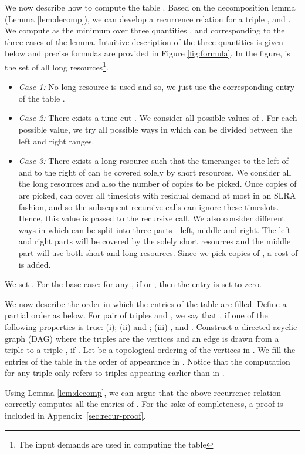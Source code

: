 \documentclass[11pt]{article}
\begin{document}
We now describe how to compute the table . 
Based on the decomposition lemma (Lemma \ref{lem:decomp}), we can develop a recurrence relation 
for a triple ,  and . 
We compute  as the minimum over three quantities ,  and  corresponding to the three cases
of the lemma. Intuitive description of the three quantities is given below and precise formulas are provided
in Figure \ref{fig:formula}. In the figure,  is the set of all long resources\footnote{The input demands
 are used in computing the table }.
\begin{itemize}
\item 
{\it Case 1: } 
No long resource is used and so, we just use the 
corresponding entry of the table . 
\item
{\it Case 2: } There exists a time-cut . We consider all possible values
of . For each possible value, we try all possible ways in which  can be divided between the left and right ranges.
\item
{\it Case 3: }
There exists a long resource  such that the timeranges to the left of and to the right of
 can be covered solely by short resources.
We consider all the long resources  and also the number of copies  to be picked.
Once  copies of  are picked,  can cover all timeslots with residual demand at most
 in an SLRA fashion, and so the subsequent recursive calls can ignore these timeslots.
Hence, this value is passed to the recursive call.
We also consider different ways in which  can be split into three parts - left, middle and right.
The left and right parts will be covered by the solely short resources and the middle part will use both 
short and long resources.
Since we pick  copies of , a cost of  is added.
\end{itemize}
We set . For the base case: for any , if  or ,
then the entry is set to zero.

We now describe the order in which the entries of the table are filled.
Define a partial order  as below.
For pair of triples  and ,
we say that , if one of the following properties is true:
(i); 
(ii)  and ; 
(iii) ,  and .
Construct a directed acyclic graph (DAG)  where the triples
are the vertices and an  edge is drawn from a triple  to a triple ,
if . Let  be a topological ordering of the vertices in .
We fill the entries of the table  in the order of appearance in .
Notice that the computation for any triple  only refers to triples appearing
earlier than  in .


Using Lemma \ref{lem:decomp}, we can argue that the above recurrence relation correctly computes
all the entries of . 
For the sake of completeness, a proof is included in Appendix~\ref{sec:recur-proof}.
\end{document}
